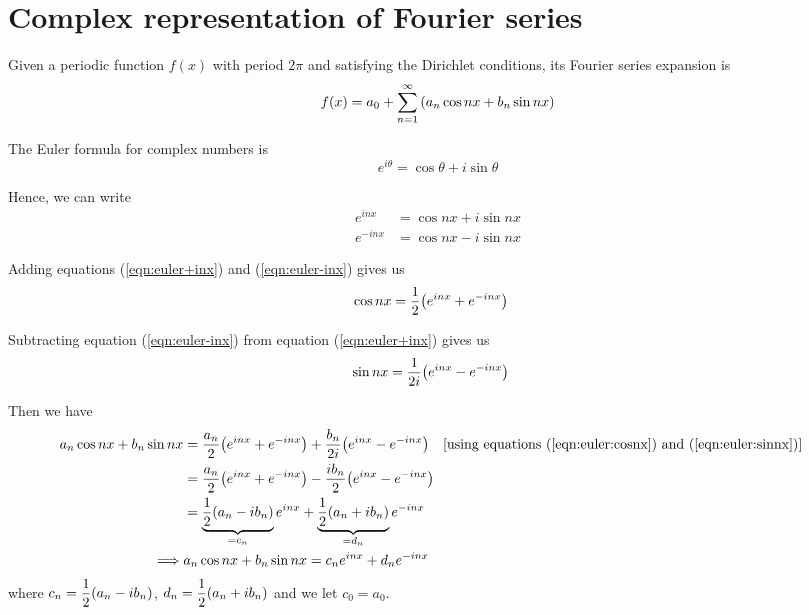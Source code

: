 \setcounter{equation}{0}
\section{Complex representation of Fourier series}
    Given a periodic function $f(x)$ with period $2\pi$ and satisfying the Dirichlet conditions, its Fourier series expansion is
    \begin{align}
        f(x)=a_0+\sum_{n=1}^{\infty}{\qty(a_n\cos{nx}+b_n\sin{nx})} \label{eqn:fourier-complex}
    \end{align}

    The Euler formula for complex numbers is
    $$e^{i\theta}=\cos{\theta}+i\sin{\theta}$$

    Hence, we can write
    \begin{align}
        e^{inx}&=\cos{nx}+i\sin{nx} \label{eqn:euler+inx} \\
        e^{-inx}&=\cos{nx}-i\sin{nx} \label{eqn:euler-inx}
    \end{align}

    Adding equations (\ref{eqn:euler+inx}) and (\ref{eqn:euler-inx}) gives us
    \begin{align}
        \cos{nx}&=\dfrac{1}{2}\qty(e^{inx}+e^{-inx}) \label{eqn:euler:cosnx}
    \end{align}

    Subtracting equation (\ref{eqn:euler-inx}) from equation (\ref{eqn:euler+inx}) gives us
    \begin{align}
        \sin{nx}&=\dfrac{1}{2i}\qty(e^{inx}-e^{-inx}) \label{eqn:euler:sinnx}
    \end{align}

    Then we have
    \begin{align}
        a_n\cos{nx}+b_n\sin{nx}&=\dfrac{a_n}{2}\qty(e^{inx}+e^{-inx})+\dfrac{b_n}{2i}\qty(e^{inx}-e^{-inx})\qq{[using equations (\ref{eqn:euler:cosnx}) and (\ref{eqn:euler:sinnx})]} \nonumber\\
            &=\dfrac{a_n}{2}\qty(e^{inx}+e^{-inx})-\dfrac{ib_n}{2}\qty(e^{inx}-e^{-inx}) \nonumber \\
            &=\underbrace{\dfrac{1}{2}\qty(a_n-ib_n)}_{=c_n}e^{inx}+\underbrace{\dfrac{1}{2}\qty(a_n+ib_n)}_{=d_n}e^{-inx} \nonumber \\
        \implies &a_n\cos{nx}+b_n\sin{nx}=c_ne^{inx}+d_ne^{-inx} \label{eqn:euler:an-bn-cn-dn}
    \end{align}
    where $c_n=\dfrac{1}{2}\qty(a_n-ib_n)$, $d_n=\dfrac{1}{2}\qty(a_n+ib_n)$ and we let $c_0=a_0$.

